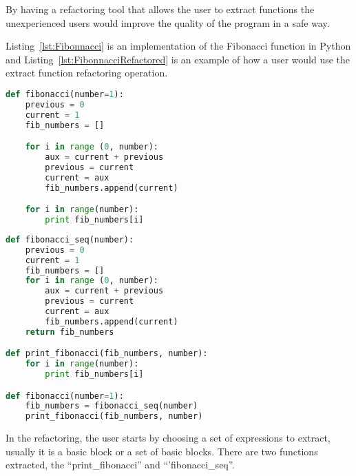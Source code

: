 By having a refactoring tool that allows the user to extract functions the unexperienced users would improve the quality of the program in a safe way.

 Listing~\ref{lst:Fibonnacci} is an implementation of the Fibonacci function in Python and Listing~\ref{lst:FibonnacciRefactored} is an example of how a user would use the extract function refactoring operation.

\begin{lstlisting}[frame=single, caption=Fibonacci function first implementation, label={lst:Fibonnacci}, language=Python]
def fibonacci(number=1):
	previous = 0
	current = 1
	fib_numbers = []

	for i in range (0, number):
		aux = current + previous
		previous = current
		current = aux
		fib_numbers.append(current)

	for i in range(number):
		print fib_numbers[i]
\end{lstlisting}


\begin{lstlisting}[frame=single, caption=Fibonacci function after using extract function, label={lst:FibonnacciRefactored}, language=Python]
def fibonacci_seq(number):
	previous = 0
	current = 1
	fib_numbers = []
	for i in range (0, number):
		aux = current + previous
		previous = current
		current = aux
		fib_numbers.append(current)
	return fib_numbers

def print_fibonacci(fib_numbers, number):
	for i in range(number):
		print fib_numbers[i]

def fibonacci(number=1):
	fib_numbers = fibonacci_seq(number)
	print_fibonacci(fib_numbers, number)
\end{lstlisting}


In the refactoring, the user starts by choosing a set of expressions to extract, usually it is a  basic block or a set of basic blocks.
There are two functions extracted, the ``print\_fibonacci'' and ``'fibonacci\_seq''.

